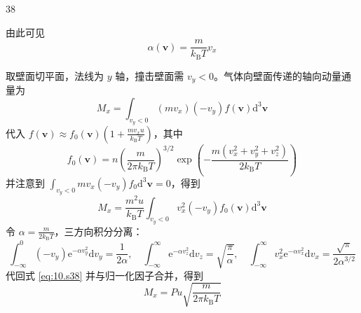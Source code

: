 \begin{solution}{38}
\begin{subsolution}
\begin{subsubsolution}
\begin{equation}
                \label{eq:6.s38}
            \end{equation}
            由此可见
            \begin{equation}
                \alpha (\pmb {v}) = \frac {m}{k _ {\mathrm{B}} T} v _ {x}
                \label{eq:7.s38}
            \end{equation}
        \end{subsubsolution}
        \begin{subsubsolution}
            取壁面切平面，法线为 $y$ 轴，撞击壁面需 $v_{y} < 0$。气体向壁面传递的轴向动量通量为
            \begin{equation}
                M _ {x} = \int_ {v _ {y} <   0} (m v _ {x}) (- v _ {y}) f (\pmb {v}) \mathrm{d} ^ {3} \pmb {v}
                \label{eq:8.s38}
            \end{equation}
            代入 $f(\pmb {v})\approx f_0(\pmb {v})\left(1 + \frac{mv_xu}{k_{\mathrm{B}}T}\right)$，其中
            \begin{equation}
                f _ {0} (\boldsymbol {v}) = n \left(\frac {m}{2 \pi k _ {\mathrm{B}} T}\right) ^ {3 / 2} \exp \left(- \frac {m (v _ {x} ^ {2} + v _ {y} ^ {2} + v _ {z} ^ {2})}{2 k _ {\mathrm{B}} T}\right)
                \label{eq:9.s38}
            \end{equation}
            并注意到 $\int_{v_y < 0} mv_x(-v_y)f_0\mathrm{d}^3\pmb {v} = 0$，得到
            \begin{equation}
                M _ {x} = \frac {m ^ {2} u}{k _ {\mathrm{B}} T} \int_ {v _ {y} <   0} v _ {x} ^ {2} (- v _ {y}) f _ {0} (\pmb {v}) \mathrm{d} ^ {3} \pmb {v}
                \label{eq:10.s38}
            \end{equation}
            令 $\alpha = \frac{m}{2k_{\mathrm{B}}T}$，三方向积分分离：
            \begin{equation}
                \int_ {- \infty} ^ {0} (- v _ {y}) \mathrm{e} ^ {- \alpha v _ {y} ^ {2}} \mathrm{d} v _ {y} = \frac {1}{2 \alpha}, \quad \int_ {- \infty} ^ {\infty} \mathrm{e} ^ {- \alpha v _ {z} ^ {2}} \mathrm{d} v _ {z} = \sqrt {\frac {\pi}{\alpha}}, \quad \int_ {- \infty} ^ {\infty} v _ {x} ^ {2} \mathrm{e} ^ {- \alpha v _ {x} ^ {2}} \mathrm{d} v _ {x} = \frac {\sqrt {\pi}}{2 \alpha^ {3 / 2}}
                \label{eq:11.s38}
            \end{equation}
            代回式 \eqref{eq:10.s38} 并与归一化因子合并，得到
            \begin{equation}
                M _ {x} = P u \sqrt {\frac {m}{2 \pi k _ {\mathrm{B}} T}}

\end{equation}
\end{subsubsolution}
\end{subsolution}
\end{solution}
